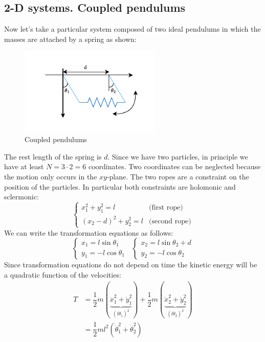 \subsection{2-D systems. Coupled pendulums}
Now let's take a particular system composed of two ideal pendulums in which the masses are attached by a spring as shown:
\begin{figure}[!ht]
    \centering
    \includegraphics[width=0.6\textwidth]{res/svg/couple_pendulum_1.drawio}
    \caption{Coupled pendulums}
\end{figure}
The rest length of the spring is $d$. Since we have two particles, in principle we have at least $N=3\cdot2=6$ coordinates. Two coordinates can be neglected because the motion only occurs in the $xy$-plane.
The two ropes are a constraint on the position of the particles. In particular both constraints are holomonic and sclermonic:
\begin{equation}
    \begin{cases}
        x_1^2 + y_1^2 = l & \text{(first rope)}\\
        (x_2-d)^2 + y_2^2 = l & \text{(second rope)}
    \end{cases}
\end{equation}
We can write the transformation equations as follows:
\begin{equation}
    \begin{cases}
        x_1 = l\sin\theta_1\\
        y_1 = -l\cos\theta_1
    \end{cases}\;\;
    \begin{cases}
        x_2 = l\sin\theta_2+d\\
        y_2 = -l\cos\theta_2
    \end{cases}
\end{equation}
Since transformation equations do not depend on time the kinetic energy will be a quadratic function of the velocities:
\begin{equation}
    \begin{split}
        T &= \dfrac{1}{2}m(\underbrace{\dot{x}_1^2+\dot{y}_1^2}_{(l\dot{\theta}_1)^2}) + \dfrac{1}{2}m(\underbrace{\dot{x}_2^2+\dot{y}_2^2}_{(l\dot{\theta}_2)^2}) \\
        &= \dfrac{1}{2}ml^2(\dot{\theta}_1^2+\dot{\theta}_2^2)
    \end{split}
\end{equation}
